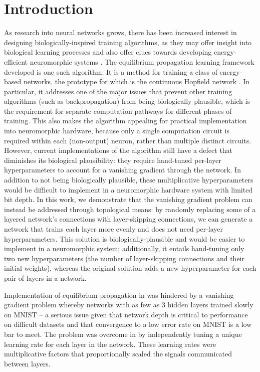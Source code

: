 \documentclass[utf8]{frontiersSCNS}
\begin{document}
\section{Introduction}

As research into neural networks grows, there has been increased interest in designing biologically-inspired training algorithms, as they may offer insight into biological learning processes and also offer clues towards developing energy-efficient neuromorphic systems \citep{wozniak2018, crafton2019, ernoult2020, bartunov2018, lillicrap2014, bengio2015}. The equilibrium propagation learning framework developed \cite{scellier17} is one such algorithm.  It is a method for training a class of energy-based networks, the prototype for which is the continuous Hopfield network \cite{hopfield1984}.  In particular, it addresses one of the major issues that prevent other training algorithms (such as backpropagation) from being biologically-plausible, which is the requirement for separate computation pathways for different phases of training. This also makes the algorithm appealing for practical implementation into neuromorphic hardware, because only a single computation circuit is required within each (non-output) neuron, rather than multiple distinct circuits. However, current implementations of the algorithm still have a defect that diminishes its biological plausibility: they require hand-tuned per-layer hyperparameters to account for a vanishing gradient through the network. In addition to not being biologically plausible, these multiplicative hyperparameters would be difficult to implement in a neuromorphic hardware system with limited bit depth. In this work, we demonstrate that the vanishing gradient problem can instead be addressed through topological means: by randomly replacing some of a layered network's connections with layer-skipping connections, we can generate a network that trains each layer more evenly and does not need per-layer hyperparameters. This solution is biologically-plausible and would be easier to implement in a neuromorphic system; additionally, it entails hand-tuning only two new hyperparameters (the number of layer-skipping connections and their initial weights), whereas the original solution adds a new hyperparameter for each pair of layers in a network.


Implementation of equilibrium propagation in \citep{scellier17} was hindered by a vanishing gradient problem whereby networks with as few as 3 hidden layers trained slowly on MNIST \citep{mnist1998} -- a serious issue given that network depth is critical to performance on difficult datasets \citep{simonyan2014, srivastava2015tvdn} and that convergence to a low error rate on MNIST is a low bar to meet. The problem was overcome in \citep{scellier17} by independently tuning a unique learning rate for each layer in the network.  These learning rates were multiplicative factors that proportionally scaled the signals communicated between layers.
\end{document}
